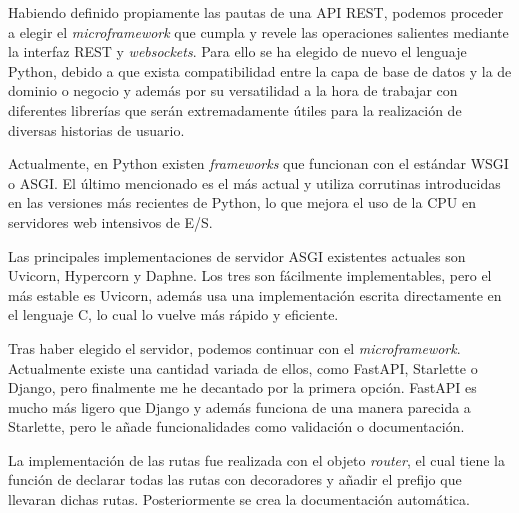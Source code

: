 \vspace{0.3cm}

Habiendo definido propiamente las pautas de una \ac{API} \ac{REST}, podemos proceder a elegir el \textit{microframework} que cumpla y revele las operaciones salientes mediante la interfaz \ac{REST} y \textit{websockets}. Para ello se ha elegido de nuevo el lenguaje Python, debido a que exista compatibilidad entre la capa de base de datos y la de dominio o negocio y además por su versatilidad a la hora de trabajar con diferentes librerías que  serán extremadamente útiles para la realización de diversas historias de usuario.

\vspace{0.3cm}

Actualmente, en Python existen \textit{frameworks} que funcionan con el estándar \ac{WSGI} o \ac{ASGI}. El último mencionado es el más actual y utiliza corrutinas introducidas en las versiones más recientes de Python, lo que mejora el uso de la CPU en servidores web intensivos de E/S.

\vspace{0.3cm}

Las principales implementaciones de servidor \ac{ASGI} existentes actuales son Uvicorn, Hypercorn y Daphne. Los tres son fácilmente implementables, pero el más estable es Uvicorn, además usa una implementación escrita directamente en el lenguaje C, lo cual lo vuelve más rápido y eficiente. \cite{uvicorn-manual}

\vspace{0.3cm}

Tras haber elegido el servidor, podemos continuar con el \textit{microframework}. Actualmente existe una cantidad variada de ellos, como FastAPI, Starlette o Django, pero finalmente me he decantado por la primera opción. FastAPI es mucho más ligero que Django y además funciona de una manera parecida a Starlette, pero le añade funcionalidades como validación o documentación. \cite{fastapi-manual}

\vspace{0.3cm}

La implementación de las rutas fue realizada con el objeto \textit{router}, el cual tiene la función de declarar todas las rutas con decoradores y añadir el prefijo que llevaran dichas rutas. Posteriormente se crea la documentación automática.

\vspace{0.3cm}

